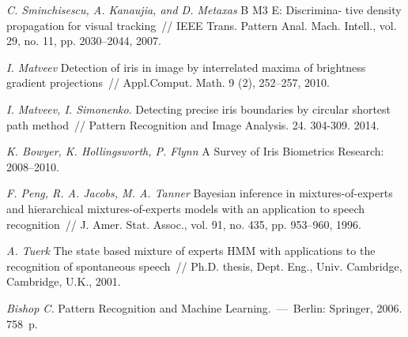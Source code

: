 \documentclass[12pt, twoside]{article}
\numberwithin{equation}{section}
\begin{document}
\begin{thebibliography}{99}
	\textit{C. Sminchisescu, A. Kanaujia, and D. Metaxas} B M3 E: Discrimina- tive density propagation for visual tracking~// IEEE Trans. Pattern Anal. Mach. Intell., vol. 29, no. 11, pp. 2030–2044, 2007.

	
	\textit{I. Matveev} Detection of iris in image by interrelated maxima of brightness gradient projections~// Appl.Comput. Math. 9 (2), 252–257, 2010.

	\textit{I. Matveev, I. Simonenko}. Detecting precise iris boundaries by circular shortest path method~// Pattern Recognition and Image Analysis. 24. 304-309. 2014.
	
	\textit{K. Bowyer, K. Hollingsworth, P. Flynn} A Survey of Iris Biometrics Research: 2008–2010.

	\textit{F. Peng, R. A. Jacobs, M. A. Tanner} Bayesian inference in mixtures-of-experts and hierarchical mixtures-of-experts models with an application to speech recognition~// J. Amer. Stat. Assoc., vol. 91, no. 435, pp. 953–960, 1996.
	
	\textit{A. Tuerk} The state based mixture of experts HMM with applications to the recognition of spontaneous speech~// Ph.D. thesis, Dept. Eng., Univ. Cambridge, Cambridge, U.K., 2001.
	
	\textit{Bishop C.} Pattern Recognition and Machine Learning.~---~Berlin: Springer, 2006. 758~p.

 \end{thebibliography}
\end{document}
